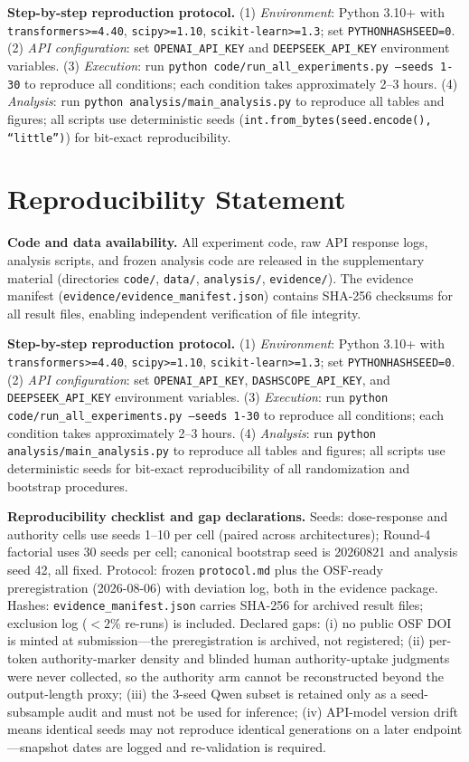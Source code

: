\documentclass[11pt]{article}
\begin{document}
\textbf{Step-by-step reproduction protocol.} (1) \textit{Environment}: Python 3.10+ with \texttt{transformers>=4.40}, \texttt{scipy>=1.10}, \texttt{scikit-learn>=1.3}; set \texttt{PYTHONHASHSEED=0}. (2) \textit{API configuration}: set \texttt{OPENAI\_API\_KEY} and \texttt{DEEPSEEK\_API\_KEY} environment variables. (3) \textit{Execution}: run \texttt{python code/run\_all\_experiments.py --seeds 1-30} to reproduce all conditions; each condition takes approximately 2--3 hours. (4) \textit{Analysis}: run \texttt{python analysis/main\_analysis.py} to reproduce all tables and figures; all scripts use deterministic seeds (\texttt{int.from\_bytes(seed.encode(), ``little'')}) for bit-exact reproducibility.


\section*{Reproducibility Statement}
\label{sec:reproducibility}

\textbf{Code and data availability.} All experiment code, raw API response logs, analysis scripts, and frozen analysis code are released in the supplementary material (directories \texttt{code/}, \texttt{data/}, \texttt{analysis/}, \texttt{evidence/}). The evidence manifest (\texttt{evidence/evidence\_manifest.json}) contains SHA-256 checksums for all result files, enabling independent verification of file integrity.

\textbf{Step-by-step reproduction protocol.} (1) \textit{Environment}: Python 3.10+ with \texttt{transformers>=4.40}, \texttt{scipy>=1.10}, \texttt{scikit-learn>=1.3}; set \texttt{PYTHONHASHSEED=0}. (2) \textit{API configuration}: set \texttt{OPENAI\_API\_KEY}, \texttt{DASHSCOPE\_API\_KEY}, and \texttt{DEEPSEEK\_API\_KEY} environment variables. (3) \textit{Execution}: run \texttt{python code/run\_all\_experiments.py --seeds 1-30} to reproduce all conditions; each condition takes approximately 2--3 hours. (4) \textit{Analysis}: run \texttt{python analysis/main\_analysis.py} to reproduce all tables and figures; all scripts use deterministic seeds for bit-exact reproducibility of all randomization and bootstrap procedures.

\textbf{Reproducibility checklist and gap declarations.} Seeds: dose-response and authority cells use seeds 1--10 per cell (paired across architectures); Round-4 factorial uses 30 seeds per cell; canonical bootstrap seed is 20260821 and analysis seed 42, all fixed. Protocol: frozen \texttt{protocol.md} plus the OSF-ready preregistration (2026-08-06) with deviation log, both in the evidence package. Hashes: \texttt{evidence\_manifest.json} carries SHA-256 for archived result files; exclusion log ($<2\%$ re-runs) is included. Declared gaps: (i) no public OSF DOI is minted at submission---the preregistration is archived, not registered; (ii) per-token authority-marker density and blinded human authority-uptake judgments were never collected, so the authority arm cannot be reconstructed beyond the output-length proxy; (iii) the $3$-seed Qwen subset is retained only as a seed-subsample audit and must not be used for inference; (iv) API-model version drift means identical seeds may not reproduce identical generations on a later endpoint---snapshot dates are logged and re-validation is required.
\end{document}
